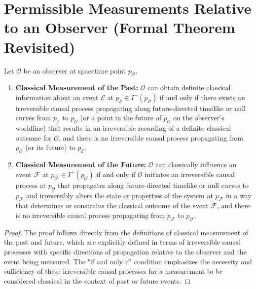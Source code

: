 	\section{Permissible Measurements Relative to an Observer (Formal Theorem Revisited)}
	
	\begin{theorem}
		Let $\mathcal{O}$ be an observer at spacetime point $p_{\mathcal{O}}$.
		
		\begin{enumerate}
			\item \textbf{Classical Measurement of the Past:} $\mathcal{O}$ can obtain definite classical information about an event $\mathcal{E}$ at $p_{\mathcal{E}} \in I^-(p_{\mathcal{O}})$ if and only if there exists an irreversible causal process propagating along future-directed timelike or null curves from $p_{\mathcal{E}}$ to $p_{\mathcal{O}}$ (or a point in the future of $p_{\mathcal{O}}$ on the observer's worldline) that results in an irreversible recording of a definite classical outcome for $\mathcal{O}$, and there is no irreversible causal process propagating from $p_{\mathcal{O}}$ (or its future) to $p_{\mathcal{E}}$.
			
			\item \textbf{Classical Measurement of the Future:} $\mathcal{O}$ can classically influence an event $\mathcal{F}$ at $p_{\mathcal{F}} \in I^+(p_{\mathcal{O}})$ if and only if $\mathcal{O}$ initiates an irreversible causal process at $p_{\mathcal{O}}$ that propagates along future-directed timelike or null curves to $p_{\mathcal{F}}$ and irreversibly alters the state or properties of the system at $p_{\mathcal{F}}$ in a way that determines or constrains the classical outcome of the event $\mathcal{F}$, and there is no irreversible causal process propagating from $p_{\mathcal{F}}$ to $p_{\mathcal{O}}$.
		\end{enumerate}
		\begin{proof}
			The proof follows directly from the definitions of classical measurement of the past and future, which are explicitly defined in terms of irreversible causal processes with specific directions of propagation relative to the observer and the event being measured. The "if and only if" condition emphasizes the necessity and sufficiency of these irreversible causal processes for a measurement to be considered classical in the context of past or future events.
		\end{proof}
	\end{theorem}
	
